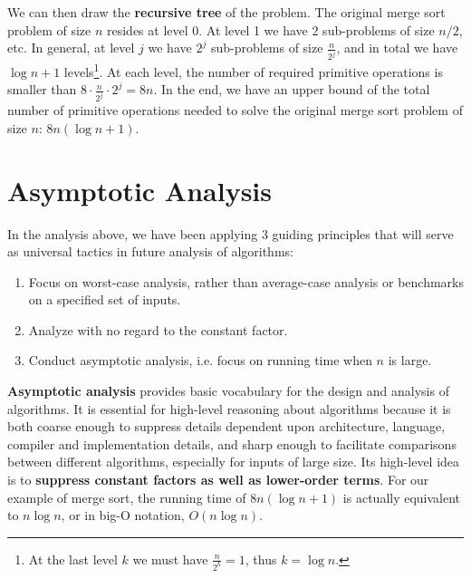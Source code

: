 We can then draw the \textbf{recursive tree} of the problem. The original merge sort problem of size $n$ resides at level 0. At level 1 we have 2 sub-problems of size $n/2$, etc. In general, at level $j$ we have $2^j$ sub-problems of size $\frac{n}{2^j}$, and in total we have $\log n+1$ levels\footnote{At the last level $k$ we must have $\frac{n}{2^k}=1$, thus $k=\log n$.}. At each level, the number of required primitive operations is smaller than $8\cdot\frac{n}{2^j}\cdot 2^j=8n$. In the end, we have an upper bound of the total number of primitive operations needed to solve the original merge sort problem of size $n$: $8n(\log n+1)$.
\section{Asymptotic Analysis}
In the analysis above, we have been applying 3 guiding principles that will serve as universal tactics in future analysis of algorithms:
\begin{enumerate}
\item Focus on worst-case analysis, rather than average-case analysis or benchmarks on a specified set of inputs.
\item Analyze with no regard to the constant factor.
\item Conduct asymptotic analysis, i.e. focus on running time when $n$ is large.
\end{enumerate}

\textbf{Asymptotic analysis} provides basic vocabulary for the design and analysis of algorithms. It is essential for high-level reasoning about algorithms because it is both coarse enough to suppress details dependent upon architecture, language, compiler and implementation details, and sharp enough to facilitate comparisons between different algorithms, especially for inputs of large size. Its high-level idea is to \textbf{suppress constant factors as well as lower-order terms}. For our example of merge sort, the running time of $8n(\log n+1)$ is actually equivalent to $n\log n$, or in big-O notation, $O(n\log n)$.
